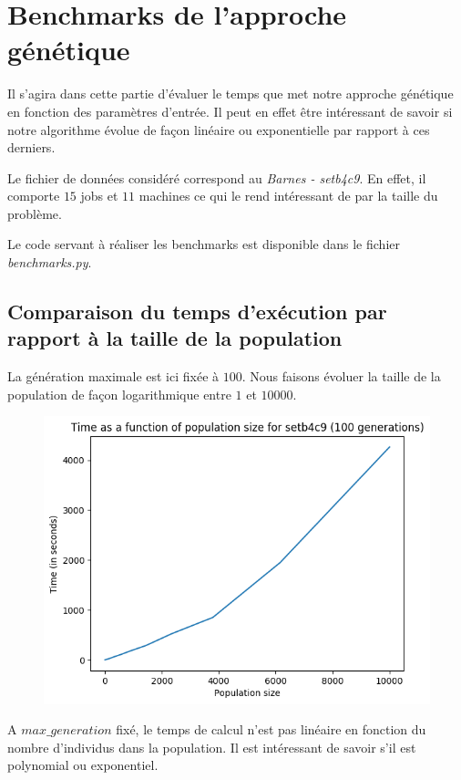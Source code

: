 \section{Benchmarks de l'approche génétique}

Il s'agira dans cette partie d'évaluer le temps que met notre approche génétique en fonction des paramètres d'entrée. Il peut en effet être intéressant de savoir si notre algorithme évolue de façon linéaire ou exponentielle par rapport à ces derniers.

Le fichier de données considéré correspond au \textit{Barnes - setb4c9}. En effet, il comporte $15$ jobs et $11$ machines ce qui le rend intéressant de par la taille du problème.

Le code servant à réaliser les benchmarks est disponible dans le fichier \textit{benchmarks.py}.

\subsection{Comparaison du temps d'exécution par rapport à la taille de la population}

La génération maximale est ici fixée à $100$. Nous faisons évoluer la taille de la population de façon logarithmique entre $1$ et $10000$.

\begin{figure}[!h]
    \centering
    \includegraphics[]{report/Pictures/setb4c9_benchmarks_population.png}
\end{figure}

A $max\_generation$ fixé, le temps de calcul n'est pas linéaire en fonction du nombre d'individus dans la population. Il est intéressant de savoir s'il est polynomial ou exponentiel.

